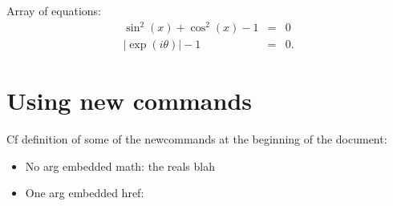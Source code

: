 Array of equations:
\begin{eqnarray}
    \sin^2(x)+\cos^2(x) - 1 &=& 0\nonumber\\
    |\exp(i\theta)|-1 &=& 0.
\end{eqnarray}

\section{\label{sec:newcom}Using new commands}
Cf definition of some of the newcommands at the beginning of the document:
\begin{itemize}
    \item No arg embedded math: the reals \RR blah
    \item One arg embedded href: 
\end{itemize}


